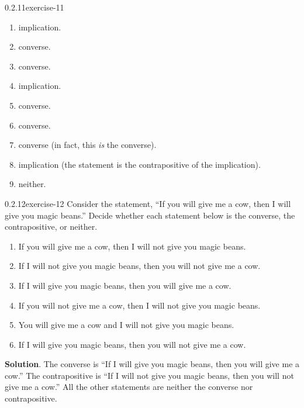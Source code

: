 \documentclass[twoside,11pt,]{book}
\numberwithin{equation}{chapter}
\begin{document}
\begin{divisionsolution}{0.2.11}{}{exercise-11}
\begin{enumerate}[label=(\alph*)]
neither.%
\item\hypertarget{li-280}{}\hypertarget{p-293}{}%
implication.%
\item\hypertarget{li-281}{}\hypertarget{p-294}{}%
converse.%
\item\hypertarget{li-282}{}\hypertarget{p-295}{}%
converse.%
\item\hypertarget{li-283}{}\hypertarget{p-296}{}%
implication.%
\item\hypertarget{li-284}{}\hypertarget{p-297}{}%
converse.%
\item\hypertarget{li-285}{}\hypertarget{p-298}{}%
converse.%
\item\hypertarget{li-286}{}\hypertarget{p-299}{}%
converse (in fact, this \emph{is} the converse).%
\item\hypertarget{li-287}{}\hypertarget{p-300}{}%
implication (the statement is the contrapositive of the implication).%
\item\hypertarget{li-288}{}\hypertarget{p-301}{}%
neither.%
\end{enumerate}
%
\end{divisionsolution}%
\begin{divisionsolution}{0.2.12}{}{exercise-12}%
\hypertarget{p-310}{}%
Consider the statement, ``If you will give me a cow, then I will give you magic beans.'' Decide whether each statement below is the converse, the contrapositive, or neither.\leavevmode%
\begin{enumerate}[label=(\alph*)]
\item\hypertarget{li-295}{}\hypertarget{p-311}{}%
If you will give me a cow, then I will not give you magic beans. %
\item\hypertarget{li-300}{}\hypertarget{p-312}{}%
If I will not give you magic beans, then you will not give me a cow. %
\item\hypertarget{li-305}{}\hypertarget{p-313}{}%
If I will give you magic beans, then you will give me a cow. %
\item\hypertarget{li-310}{}\hypertarget{p-314}{}%
If you will not give me a cow, then I will not give you magic beans. %
\item\hypertarget{li-315}{}\hypertarget{p-315}{}%
You will give me a cow and I will not give you magic beans. %
\item\hypertarget{li-320}{}\hypertarget{p-316}{}%
If I will give you magic beans, then you will not give me a cow. %
\end{enumerate}
%
\par\smallskip%
\noindent\textbf{Solution}.\quad%
\hypertarget{p-317}{}%
The converse is ``If I will give you magic beans, then you will give me a cow.'' The contrapositive is ``If I will not give you magic beans, then you will not give me a cow.'' All the other statements are neither the converse nor contrapositive.%
\end{divisionsolution}%
\end{document}
